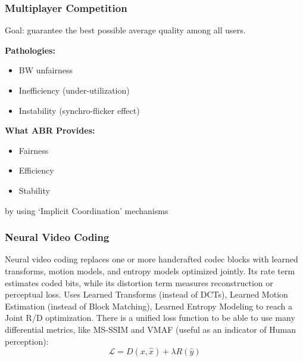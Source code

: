 \subsubsection{Multiplayer Competition}
Goal: guarantee the best possible average quality among all users.\\
\begin{minipage}{0.475\textwidth}
    \textbf{Pathologies:}
    \begin{itemize}
        \item BW unfairness
        \item Inefficiency (under-utilization)
        \item Instability (synchro-flicker effect)
    \end{itemize}
\end{minipage}
\begin{minipage}{0.475\textwidth}
    \textbf{What ABR Provides:}
    \begin{itemize}
        \item Fairness
        \item Efficiency
        \item Stability
    \end{itemize}
    by using `Implicit Coordination' mechanisms
\end{minipage}
\subsubsection{Neural Video Coding}
Neural video coding replaces one or more handcrafted codec blocks with learned transforms, motion models, and entropy models optimized jointly. Its rate term estimates coded bits, while its distortion term measures reconstruction or perceptual loss.
Uses Learned Transforms (instead of DCTs), Learned Motion Estimation (instead of Block Matching), Learned Entropy Modeling to reach a Joint R/D optimization. There is a unified loss function to be able to use many differential metrics, like MS-SSIM and VMAF (useful as an indicator of Human perception):
$$\mathcal{L} = D(x,\hat{x}) + \lambda R(\hat{y})$$

